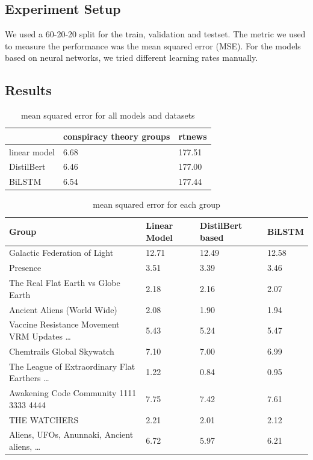 \subsection{Experiment Setup}
\label{subsec:experiments:setup}
We used a 60-20-20 split for the train, validation and testset. The metric we used to 
measure the performance was the mean squared error (MSE). For the models based on neural
networks, we tried different learning rates manually. 

\subsection{Results}
\label{subsec:experiments:results}
\begin{table}[tb]
    \caption{mean squared error for all models and datasets}
    \label{tab:results-all}
    \centering

    \begin{tabular}{l|l|l}
    \hline

    \hline
    & \textbf{conspiracy theory groups} & \textbf{rtnews}\\
    \hline
    linear model & 6.68 & 177.51\\
    \hline
    DistilBert & 6.46 & 177.00\\
    \hline
    BiLSTM & 6.54 & 177.44\\
    \hline
    \end{tabular}
\end{table}
\begin{table}[tb]
    \caption{mean squared error for each group}
    \label{tab:result-mse-per-group}
    \centering
    \begin{tabular}{l|l|l|l}
        Group & Linear Model & DistilBert based & BiLSTM \\
        \hline
        \hline
        Galactic Federation of Light & 12.71 & 12.49 & 12.58\\
        Presence & 3.51 & 3.39 & 3.46\\
        The Real Flat Earth vs Globe Earth & 2.18 & 2.16 & 2.07\\
        Ancient Aliens (World Wide) & 2.08 & 1.90 & 1.94\\
        Vaccine Resistance Movement VRM Updates \dots & 5.43 & 5.24 & 5.47\\
        Chemtrails Global Skywatch & 7.10 & 7.00 & 6.99\\
        The League of Extraordinary Flat Earthers \dots & 1.22 & 0.84 & 0.95\\
        Awakening Code Community 1111 3333 4444 & 7.75 & 7.42 & 7.61\\
        THE WATCHERS & 2.21 & 2.01 & 2.12\\
        Aliens, UFOs, Anunnaki, Ancient aliens, \dots & 6.72 & 5.97 & 6.21\\
    \end{tabular}
\end{table}
